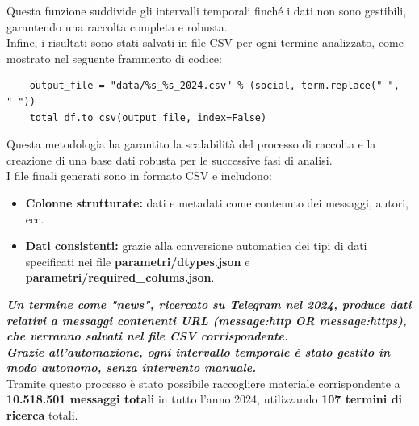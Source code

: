 \documentclass[12pt]{article}
\begin{document}
	Questa funzione suddivide gli intervalli temporali finché i dati non sono gestibili, garantendo una raccolta completa e robusta.\\
	Infine, i risultati sono stati salvati in file CSV per ogni termine analizzato, come mostrato nel seguente frammento di codice:
	\begin{lstlisting}
	output_file = "data/%s_%s_2024.csv" % (social, term.replace(" ", "_"))
	total_df.to_csv(output_file, index=False)
	\end{lstlisting}
	Questa metodologia ha garantito la scalabilità del processo di raccolta e la creazione di una base dati robusta per le successive fasi di analisi.\\
	I file finali generati sono in formato CSV e includono:
	\begin{itemize}[label=]
		\item \textbf{Colonne strutturate:} dati e metadati come contenuto dei messaggi, autori, ecc.
		\item \textbf{Dati consistenti:} grazie alla conversione automatica dei tipi di dati specificati nei file \textbf{parametri/dtypes.json} e \textbf{parametri/required\_colums.json}.
	\end{itemize}
	\textbf{\textit{Un termine come "news", ricercato su Telegram nel 2024, produce dati relativi a messaggi contenenti URL (message:http OR message:https), che verranno salvati nel file CSV corrispondente.\\
	Grazie all'automazione, ogni intervallo temporale è stato gestito in modo autonomo, senza intervento manuale.}}\\
	Tramite questo processo è stato possibile raccogliere materiale corrispondente a \textbf{10.518.501 messaggi totali} in tutto l'anno 2024, utilizzando \textbf{107 termini di ricerca} totali.
\end{document}
